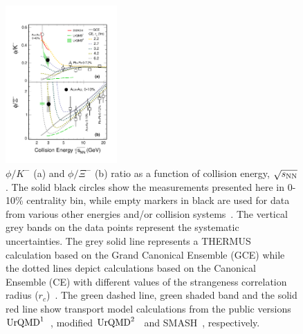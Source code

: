 \documentclass[aps,tightenlines,superscriptaddress,twocolumn]{revtex4-1}
\begin{document}
\begin{figure}
\centering
\hspace*{-4mm}
\includegraphics[width=0.38\textwidth]{fig4_phi_over_kminus_zoomin-eps-converted-to.pdf}
  \caption{$\phi/K^-$ (a) and $\phi/\Xi^-$ (b) ratio as a function of collision energy, $\sqrt{s_{\rm NN}}$. The solid black circles show the measurements presented here in 0-10\% centrality bin, while empty markers in black are used for data from various other energies and/or collision systems~\cite{E917_phi:2004,NA49_phi:2008,HADES_phi_ArKCl:2009,Xi_ArKCl_HADES:2009,FOPI_phi_NiNi:2015,FOPI_phi_AlAl:2016,HADES_phi_AuAu:2018,star_bes_strangeness:2020}. The vertical grey bands on the data points represent the systematic uncertainties. The grey solid line represents a THERMUS calculation based on the Grand Canonical Ensemble (GCE) while the dotted lines depict calculations based on the Canonical Ensemble (CE) with different values of the strangeness correlation radius ($r_c$)~\cite{THERMUS_WHEATON200984,Andronic_2018Naure}. The green dashed line, green shaded band and the solid red line show transport model calculations from the public versions $\textup{UrQMD}^{1}$~\cite{UrQMD_2:1998,urQMD:1999}, modified $\textup{UrQMD}^{2}$~\cite{Steinheimer_2015_UrQMD} and SMASH~\cite{Elfner_SMASH:2019}, respectively.}
\label{fig:phi2Kratio} 
\end{figure}


\end{document}
